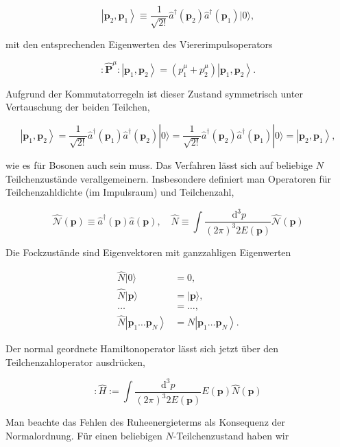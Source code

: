 \documentclass[10pt, letterpaper]{article}
\begin{document}
$$
\left|\mathbf{p}_{2}, \mathbf{p}_{1}\right\rangle \equiv \frac{1}{\sqrt{2!}} \hat{a}^{\dagger}\left(\mathbf{p}_{2}\right) \hat{a}^{\dagger}\left(\mathbf{p}_{1}\right)|0\rangle,
$$

mit den entsprechenden Eigenwerten des Viererimpulsoperators

$$
: \hat{\mathbf{P}}^{\mu}:\left|\mathbf{p}_{1}, \mathbf{p}_{2}\right\rangle=\left(p_{1}^{\mu}+p_{2}^{\mu}\right)\left|\mathbf{p}_{1}, \mathbf{p}_{2}\right\rangle .
$$

Aufgrund der Kommutatorregeln ist dieser Zustand symmetrisch unter Vertauschung der beiden Teilchen,

$$
\left|\mathbf{p}_{1}, \mathbf{p}_{2}\right\rangle=\frac{1}{\sqrt{2!}} \hat{a}^{\dagger}\left(\mathbf{p}_{1}\right) \hat{a}^{\dagger}\left(\mathbf{p}_{2}\right)|0\rangle=\frac{1}{\sqrt{2!}} \hat{a}^{\dagger}\left(\mathbf{p}_{2}\right) \hat{a}^{\dagger}\left(\mathbf{p}_{1}\right)|0\rangle=\left|\mathbf{p}_{2}, \mathbf{p}_{1}\right\rangle,
$$

wie es für Bosonen auch sein muss. Das Verfahren lässt sich auf beliebige $N$ Teilchenzustände verallgemeinern. Insbesondere definiert man Operatoren für Teilchenzahldichte (im Impulsraum) und Teilchenzahl,

$$
\hat{\mathcal{N}}(\mathbf{p}) \equiv \hat{a}^{\dagger}(\mathbf{p}) \hat{a}(\mathbf{p}), \quad \hat{N} \equiv \int \frac{\mathrm{~d}^{3} p}{(2 \pi)^{3} 2 E(\mathbf{p})} \hat{\mathcal{N}}(\mathbf{p})
$$

Die Fockzustände sind Eigenvektoren mit ganzzahligen Eigenwerten

$$
\begin{aligned}
\hat{N}|0\rangle & =0, \\
\hat{N}|\mathbf{p}\rangle & =|\mathbf{p}\rangle, \\
\ldots & =\ldots, \\
\hat{N}\left|\mathbf{p}_{1} \ldots \mathbf{p}_{N}\right\rangle & =N\left|\mathbf{p}_{1} \ldots \mathbf{p}_{N}\right\rangle .
\end{aligned}
$$

Der normal geordnete Hamiltonoperator lässt sich jetzt über den Teilchenzahloperator ausdrücken,

$$
: \hat{H}:=\int \frac{\mathrm{d}^{3} p}{(2 \pi)^{3} 2 E(\mathbf{p})} E(\mathbf{p}) \hat{N}(\mathbf{p})
$$

Man beachte das Fehlen des Ruheenergieterms als Konsequenz der Normalordnung. Für einen beliebigen $N$-Teilchenzustand haben wir
\end{document}
